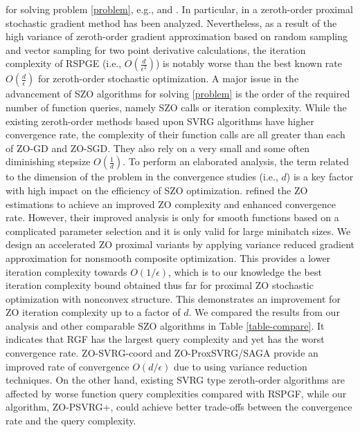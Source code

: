 for solving problem \eqref{problem}, e.g., \cite{ghadimi2016accelerated} and \cite{huang2019faster}. In particular, in \cite{ghadimi2016accelerated} a zeroth-order proximal stochastic gradient method has been analyzed. Nevertheless, as a result of the high variance of zeroth-order gradient approximation based on random sampling and vector sampling for two point derivative calculations, the iteration complexity of RSPGE (i.e., $O(\frac{d}{\epsilon^2})$) is notably worse than the best known rate $O(\frac{d}{{\epsilon}})$ for zeroth-order stochastic optimization. A major issue in the advancement of SZO algorithms for solving  \eqref{problem} is the order of the required number of function queries, namely SZO calls or iteration complexity. While the existing zeroth-order methods based upon SVRG algorithms have higher convergence rate, the complexity of their function calls are all greater than each of ZO-GD and ZO-SGD. They also rely on a very small and some often diminishing stepsize $O(\frac{1}{d})$. To perform an elaborated analysis, the term related to the dimension of the problem in the convergence studies (i.e., $d$) is a key factor with high impact on the efficiency of SZO optimization. \cite{ji2019improved} refined the ZO estimations to achieve an improved ZO complexity and enhanced convergence rate. However, their improved analysis is only for smooth functions based on a complicated parameter selection and it is only valid for large minibatch sizes.
We design an accelerated ZO proximal variants by applying variance reduced gradient approximation for nonsmooth composite optimization. This provides a lower iteration complexity towards $O(1/\epsilon )$, which is to our knowledge the best iteration complexity bound obtained thus far for proximal ZO stochastic optimization with nonconvex structure.
This demonstrates an improvement for ZO iteration complexity up to a factor of ${d}$.
\fi
We compared the results from our analysis and other comparable SZO algorithms in Table \ref{table-compare}. It indicates
that RGF has the largest query complexity and yet has the worst convergence rate. ZO-SVRG-coord
and ZO-ProxSVRG/SAGA provide an improved rate of convergence $O(d/\epsilon )$ due to using variance reduction techniques. On the other hand, existing SVRG type zeroth-order algorithms are affected by worse function query complexities compared with RSPGF, while our algorithm, ZO-PSVRG+, could achieve better trade-offs between the convergence rate and the query complexity.

\iffalse
